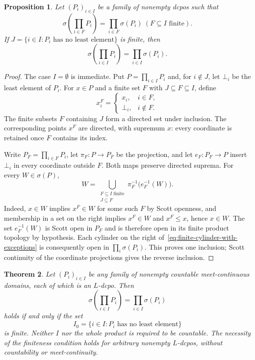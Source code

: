 \documentclass[10pt,a4paper]{amsart}
\newtheorem{theorem}{Theorem}[section]
\newtheorem{proposition}[theorem]{Proposition}
\numberwithin{equation}{section}
\newcommand{\Sc}{\sigma}
\begin{document}
\begin{proposition}\label{prop:finite-support-transfer}
Let $(P_i)_{i\in I}$ be a family of nonempty dcpos such that
\[
 \Sc\!\left(\prod_{i\in F}P_i\right)
 =\prod_{i\in F}\Sc(P_i)
 ~(F\subseteq I\text{ finite}).
\]
If $J=\{i\in I:P_i\text{ has no least element}\}$ is finite, then
\[
 \Sc\!\left(\prod_{i\in I}P_i\right)
 =\prod_{i\in I}\Sc(P_i).
\]
\end{proposition}
\begin{proof}
The case $I=\emptyset$ is immediate. Put $P=\prod_{i\in I}P_i$ and, for $i\notin J$, let $\bot_i$ be the least element of $P_i$. For $x\in P$ and a finite set $F$ with $J\subseteq F\subseteq I$, define
\begin{equation}\label{eq:finite-support-with-exceptions}
 x_i^F=
 \begin{cases}
  x_i,&i\in F,\\
  \bot_i,&i\notin F.
 \end{cases}
\end{equation}
The finite subsets $F$ containing $J$ form a directed set under inclusion. The corresponding points $x^F$ are directed, with supremum $x$: every coordinate is retained once $F$ contains its index.

Write $P_F=\prod_{i\in F}P_i$, let $\pi_F:P\to P_F$ be the projection, and let $e_F:P_F\to P$ insert $\bot_i$ in every coordinate outside $F$. Both maps preserve directed suprema. For every $W\in\Sc(P)$,
\begin{equation}\label{eq:finite-cylinder-with-exceptions}
 W=\bigcup_{\substack{F\subseteq I\text{ finite}\\J\subseteq F}}
       \pi_F^{-1}\bigl(e_F^{-1}(W)\bigr).
\end{equation}
Indeed, $x\in W$ implies $x^F\in W$ for some such $F$ by Scott openness, and membership in a set on the right implies $x^F\in W$ and $x^F\le x$, hence $x\in W$. The set $e_F^{-1}(W)$ is Scott open in $P_F$ and is therefore open in its finite product topology by hypothesis. Each cylinder on the right of~\eqref{eq:finite-cylinder-with-exceptions} is consequently open in $\prod_i\Sc(P_i)$. This proves one inclusion; Scott continuity of the coordinate projections gives the reverse inclusion.
\end{proof}


\begin{theorem}\label{thm:arbitrary-L-products}
Let $(P_i)_{i\in I}$ be any family of nonempty countable meet-continuous domains, each of which is an $L$-dcpo. Then
\begin{equation}\label{eq:arbitrary-L-product}
 \Sc\!\left(\prod_{i\in I}P_i\right)
 =\prod_{i\in I}\Sc(P_i)
\end{equation}
holds if and only if the set
\[
 I_0=\{i\in I:P_i\text{ has no least element}\}
\]
is finite. Neither $I$ nor the whole product is required to be countable. The necessity of the finiteness condition holds for arbitrary nonempty $L$-dcpos, without countability or meet-continuity.
\end{theorem}
\end{document}
